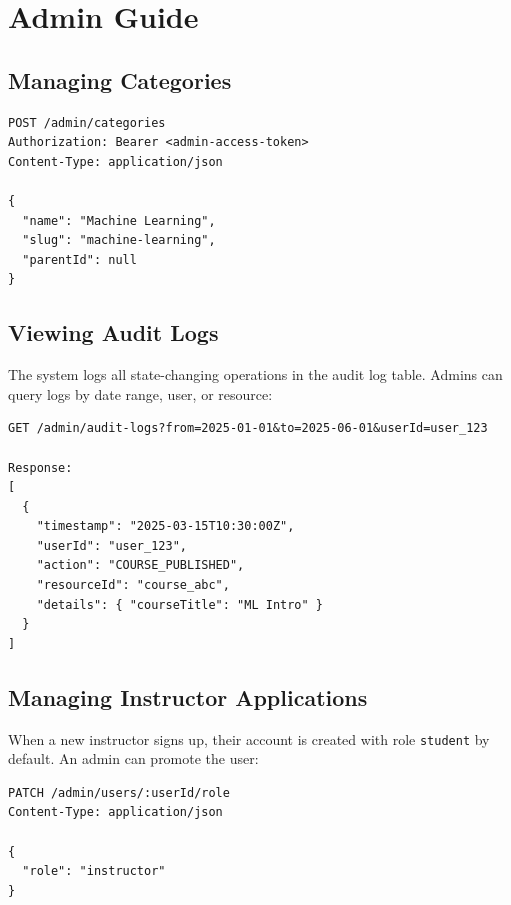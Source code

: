 \section{Admin Guide}
\label{sec:app-admin-guide}

\subsection{Managing Categories}

\begin{lstlisting}[caption=Create category,label=lst:guide-create-category]
POST /admin/categories
Authorization: Bearer <admin-access-token>
Content-Type: application/json

{
  "name": "Machine Learning",
  "slug": "machine-learning",
  "parentId": null
}
\end{lstlisting}

\subsection{Viewing Audit Logs}

The system logs all state-changing operations in the audit log table. Admins can query logs by date range, user, or resource:

\begin{lstlisting}[caption=Query audit logs,label=lst:guide-audit-logs]
GET /admin/audit-logs?from=2025-01-01&to=2025-06-01&userId=user_123

Response:
[
  {
    "timestamp": "2025-03-15T10:30:00Z",
    "userId": "user_123",
    "action": "COURSE_PUBLISHED",
    "resourceId": "course_abc",
    "details": { "courseTitle": "ML Intro" }
  }
]
\end{lstlisting}

\subsection{Managing Instructor Applications}

When a new instructor signs up, their account is created with role \texttt{student} by default. An admin can promote the user:

\begin{lstlisting}[caption=Promote user to instructor,label=lst:guide-promote]
PATCH /admin/users/:userId/role
Content-Type: application/json

{
  "role": "instructor"
}
\end{lstlisting}
